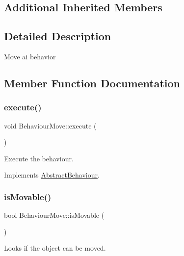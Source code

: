 \subsection*{Additional Inherited Members}


\subsection{Detailed Description}
Move ai behavior 



\subsection{Member Function Documentation}
\mbox{\label{class_behaviour_move_a4cccd6dbe5ccf37b1522fc71a807f080}} 
\subsubsection{\texorpdfstring{execute()}{execute()}}
{\footnotesize\ttfamily void Behaviour\+Move\+::execute (\begin{DoxyParamCaption}{ }\end{DoxyParamCaption})\hspace{0.3cm}{\ttfamily [virtual]}}



Execute the behaviour. 



Implements \mbox{\hyperlink{class_abstract_behaviour_ab99fb55a3b001e759e24d5b9721a742f}{Abstract\+Behaviour}}.

\mbox{\label{class_behaviour_move_a3d4182913183e85af80a1eba69a457a1}} 
\subsubsection{\texorpdfstring{is\+Movable()}{isMovable()}}
{\footnotesize\ttfamily bool Behaviour\+Move\+::is\+Movable (\begin{DoxyParamCaption}{ }\end{DoxyParamCaption})}



Looks if the object can be moved. 

